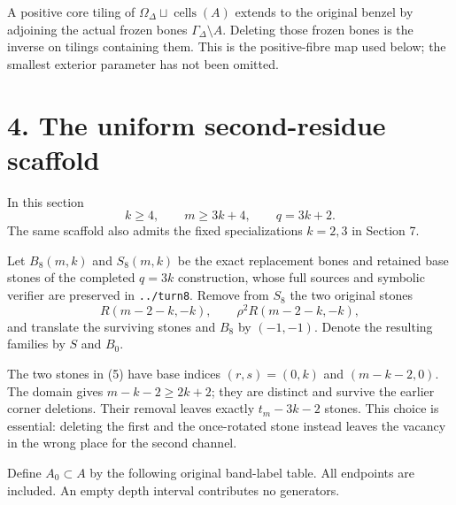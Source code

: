 \documentclass[
  11pt,
]{article}
\begin{document}
A positive core tiling of \(\Omega_\Delta\sqcup\operatorname{cells}(A)\)
extends to the original benzel by adjoining the actual frozen bones
\(\Gamma_\Delta\setminus A\). Deleting those frozen bones is the inverse
on tilings containing them. This is the positive-fibre map used below;
the smallest exterior parameter has not been omitted.

\section{4. The uniform second-residue
scaffold}\label{the-uniform-second-residue-scaffold}

In this section \[
 k\ge4,\qquad m\ge3k+4,\qquad q=3k+2.
\] The same scaffold also admits the fixed specializations \(k=2,3\) in
Section 7.

Let \(B_8(m,k)\) and \(S_8(m,k)\) be the exact replacement bones and
retained base stones of the completed \(q=3k\) construction, whose full
sources and symbolic verifier are preserved in \texttt{../turn8}. Remove
from \(S_8\) the two original stones \[
 R(m-2-k,-k),\qquad \rho^2R(m-2-k,-k),                     \tag{5}
\] and translate the surviving stones and \(B_8\) by \((-1,-1)\). Denote
the resulting families by \(S\) and \(B_0\).

The two stones in (5) have base indices \((r,s)=(0,k)\) and
\((m-k-2,0)\). The domain gives \(m-k-2\ge2k+2\); they are distinct and
survive the earlier corner deletions. Their removal leaves exactly
\(t_m-3k-2\) stones. This choice is essential: deleting the first and
the once-rotated stone instead leaves the vacancy in the wrong place for
the second channel.

Define \(A_0\subset A\) by the following original band-label table. All
endpoints are included. An empty depth interval contributes no
generators.
\end{document}
